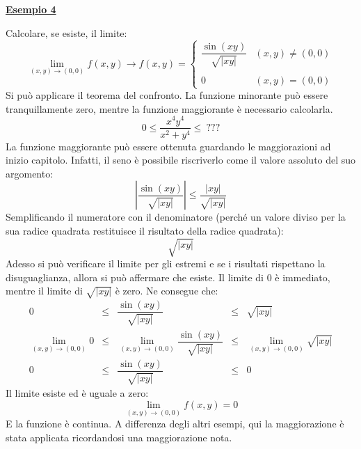 \documentclass[a4paper]{article}
\newcommand{\example}[1]{\textcolor{Green4}{\textbf{#1}}}
\begin{document}
	\begin{flushleft}
		\example{\underline{Esempio 4}}
	\end{flushleft}
	Calcolare, se esiste, il limite:
	\begin{equation*}
		\displaystyle\lim_{\left(x,y\right) \rightarrow \left(0,0\right)} f\left(x,y\right) \rightarrow f\left(x,y\right) = 
		\begin{cases}
			\dfrac{\sin\left(xy\right)}{\sqrt{\left| x y \right|}}	& \left(x,y\right) \ne \left(0,0\right) \\ \\
			0										& \left(x,y\right) = \left(0,0\right)
		\end{cases}
	\end{equation*}
	Si può applicare il teorema del confronto. La funzione minorante può essere tranquillamente zero, mentre la funzione maggiorante è necessario calcolarla.
	\begin{equation*}
		0 \le \dfrac{x^{4}y^{4}}{x^{2} + y^{4}} \le \: ???
	\end{equation*}
	La funzione maggiorante può essere ottenuta guardando le maggiorazioni ad inizio capitolo. Infatti, il seno è possibile riscriverlo come il valore assoluto del suo argomento:
	\begin{equation*}
		\left|\dfrac{\sin\left(xy\right)}{\sqrt{\left| x y \right|}}\right| \le \dfrac{\left|xy\right|}{\sqrt{\left| x y \right|}}
	\end{equation*}
	Semplificando il numeratore con il denominatore (perché un valore diviso per la sua radice quadrata restituisce il risultato della radice quadrata):
	\begin{equation*}
		\sqrt{\left| xy \right|}
	\end{equation*}
	Adesso si può verificare il limite per gli estremi e se i risultati rispettano la disuguaglianza, allora si può affermare che esiste. Il limite di $0$ è immediato, mentre il limite di $\sqrt{\left| xy \right|}$ è zero. Ne consegue che:
	\begin{equation*}
		\begin{array}{rcccl}
			0 &\le& \dfrac{\sin\left(xy\right)}{\sqrt{\left| x y \right|}} &\le& \sqrt{\left| xy \right|} \\ [1.5em]
			\displaystyle\lim_{\left(x,y\right)\rightarrow\left(0,0\right)} 0 
			&\le& 
			\displaystyle\lim_{\left(x,y\right)\rightarrow\left(0,0\right)} \dfrac{\sin\left(xy\right)}{\sqrt{\left| x y \right|}} 
			&\le& 
			\displaystyle\lim_{\left(x,y\right)\rightarrow\left(0,0\right)} \sqrt{\left| xy \right|} \\ [1.5em]
			0 &\le& \dfrac{\sin\left(xy\right)}{\sqrt{\left| x y \right|}} &\le& 0
		\end{array}
	\end{equation*}
	Il limite esiste ed è uguale a zero:
	\begin{equation*}
		\displaystyle\lim_{\left(x,y\right) \rightarrow \left(0,0\right)} f\left(x,y\right) = 0
	\end{equation*}
	E la funzione è continua. A differenza degli altri esempi, qui la maggiorazione è stata applicata ricordandosi una maggiorazione nota.\newpage
\end{document}

